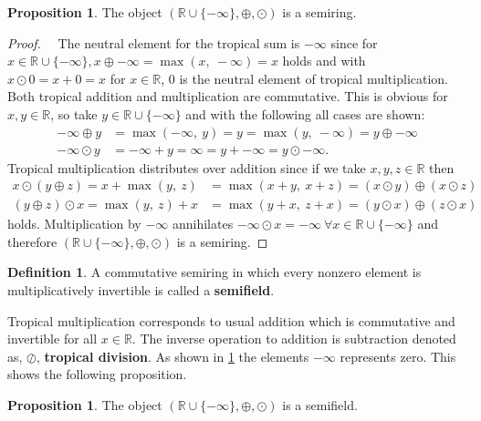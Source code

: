 \documentclass{article}
\theoremstyle{definition}
\newtheorem{definition}[theorem]{Definition}
\newtheorem{proposition}[theorem]{Proposition}
\begin{document}
\begin{proposition}\hspace{1sp}\cite[p.~10]{maclagan2015introduction}
\label{prop:trop_semiring}
The object $( \mathbb{R} \cup \{- \infty \} , \oplus , \odot )$ is a semiring.
\end{proposition}
\begin{proof}
~\
The neutral element for the tropical sum is $- \infty$ since for $x \in \mathbb{R} \cup \{- \infty \}, x \oplus -\infty = \max(x,\ - \infty) = x$ holds and with $x \odot 0 = x + 0 = x$ for $x \in \mathbb{R}$, $0$ is the neutral element of tropical multiplication. Both tropical addition and multiplication are commutative. This is obvious for $x,y \in \mathbb{R}$, so take $y \in \mathbb{R} \cup \{- \infty \}$ and with the following all cases are shown:
\begin{align*}
- \infty \oplus y &= \max (- \infty ,\ y) =   y = \max ( y,\ - \infty ) = y \oplus -\infty \\
-\infty \odot y &= -\infty +y = \infty = y+ -\infty = y \odot -\infty.
\end{align*}
Tropical multiplication distributes over addition since if we take $x, y, z \in \mathbb{R}$ then
\begin{align*}
x \odot (y \oplus z) = x + \max (y,\ z) &=   \max (x + y,\ x + z) = (x \odot y) \oplus (x \odot z) \\
(y \oplus z) \odot x = \max (y,\ z) + x &=   \max (y + x,\ z + x) = (y \odot x) \oplus (z \odot x)
\end{align*}
holds. Multiplication by $- \infty$ annihilates $- \infty \odot x = - \infty \ \forall x \in  \mathbb{R} \cup \{- \infty \}$ and therefore $(\mathbb{R}\cup\{-\infty\},\oplus,\odot)$ is a semiring.
\end{proof}

\begin{definition}\hspace{1sp}\cite{olia2020analysis}
A commutative semiring in which every nonzero element is multiplicatively invertible is called a \textbf{semifield}.
\end{definition}

Tropical multiplication corresponds to usual addition which is commutative and invertible for all $x \in \mathbb{R}$. The inverse operation to addition is subtraction denoted as, $\oslash$, \textbf{tropical division}. As shown in \ref{prop:trop_semiring} the elements $-\infty$ represents zero. This shows the following proposition.
\begin{proposition}
The object $( \mathbb{R} \cup \{- \infty \} , \oplus , \odot )$ is a semifield.
\end{proposition}
\end{document}

